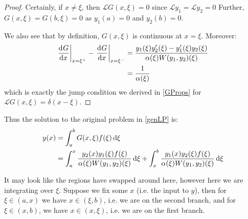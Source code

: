 \documentclass[../main.tex]{subfiles}
\begin{document}
\begin{proof}
  Certainly, if $x \neq \xi$, then $\mathcal{L}G(x, \xi) = 0$ since $\mathcal{L}y_1 = \mathcal{L}y_2 = 0$
  Further, $G(x, \xi) = G(b, \xi) = 0$ as $y_1(a) = 0$ and $y_2(b) = 0$.

  We also see that by definition, $G(x, \xi)$ is continuous at $x = \xi$.
  Moreover:
  \begin{align*}
    \at{\deriv{G}{x}}{x = \xi^{+}} - \at{\deriv{G}{x}}{x = \xi^{-}} &= \frac{y_1(\xi)y_2'(\xi) - y_1'(\xi)y_2(\xi)}{\alpha(\xi)W(y_1, y_2)(\xi)} \\
                                                                    &=\frac{1}{\alpha(\xi)}
  \end{align*}
  which is exactly the jump condition we derived in \cref{GProps} for $\mathcal{L}G(x, \xi) = \delta(x - \xi)$.
\end{proof}
Thus the solution to the original problem in \cref{genLP} is:
\begin{align*}
  y(x) &= \int_{a}^{b} G(x, \xi) f(\xi) \d{\xi} \\
       &= \int_{a}^{x} \frac{y_2(x)y_1(\xi)f(\xi)}{\alpha(\xi)W(y_1, y_2)(\xi)} \d{\xi} + \int_{x}^{b} \frac{y_1(x)y_2(\xi)f(\xi)}{\alpha(\xi)W(y_1, y_2)(\xi)} \d{\xi}
\end{align*}
\begin{remark}[Note]
  It may look like the regions have swapped around here, however here we are integrating over $\xi$.
  Suppose we fix some $x$ (i.e. the input to $y$), then for $\xi \in (a, x)$ we have $x \in (\xi, b)$, i.e. we are on the second branch, and for $\xi \in (x, b)$, we have $x \in (x, \xi)$, i.e. we are on the first branch.
\end{remark}
\end{document}

